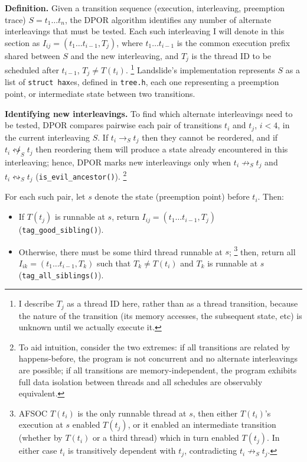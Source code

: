 {\bf Definition.}
Given a transition sequence (execution, interleaving, preemption trace) $S = t_1 \dots t_n$,
the DPOR algorithm identifies any number of alternate interleavings that must be tested.
Each such interleaving I will denote in this section as $I_{ij} = (t_1 \dots t_{i-1}, T_j)$,
where $t_1 \dots t_{i-1}$ is the common execution prefix shared between $S$ and the new interleaving,
and $T_j$ is the thread ID to be scheduled after $t_{i-1}$, $T_j \ne T(t_i)$.
\footnote{I describe $T_j$ as a thread ID here, rather than as a thread transition,
because the nature of the transition (its memory accesses, the subsequent state, etc)
is unknown until we actually execute it.}
Landslide's implementation represents $S$ as a list of {\tt struct hax}es, defined in {\tt tree.h},
each one representing a preemption point, or intermediate state between two transitions.

{\bf Identifying new interleavings.}
To find which alternate interleavings need to be tested,
DPOR compares pairwise each pair of transitions $t_i$ and $t_j$, $i<4$, in the current interleaving $S$.
If $t_i \rightarrow_S t_j$ then they cannot be reordered,
and if $t_i \not\leftrightsquigarrow_S t_j$ then reordering them
will produce a state already encountered in this interleaving;
hence, DPOR marks new interleavings only
when $t_i \not\rightarrow_S t_j$ and $t_i \leftrightsquigarrow_S t_j$
({\tt is\_evil\_ancestor()}).
\footnote{To aid intuition, consider the two extremes:
if all transitions are related by happens-before,
the program is not concurrent and no alternate interleavings are possible;
if all transitions are memory-independent,
the program exhibits full data isolation between threads and all schedules are observably equivalent.}

For each such pair, let $s$ denote the state (preemption point) before $t_i$.
Then:
\begin{itemize}
	\item If $T(t_j)$ is runnable at $s$, return $I_{ij} = (t_1 \dots t_{i-1}, T_j)$ ({\tt tag\_good\_sibling()}).
	\item Otherwise, there must be some third thread runnable at $s$;
		\footnote{AFSOC $T(t_i)$ is the only runnable thread at $s$,
		then either $T(t_i)$'s execution at $s$ enabled $T(t_j)$,
		or it enabled an intermediate transition
		(whether by $T(t_i)$ or a third thread)
		which in turn enabled $T(t_j)$.
		In either case $t_i$ is transitively dependent with $t_j$, contradicting $t_i \not\rightarrow_S t_j$.}
		then, return all $I_{ik} = (t_1 \dots t_{i-1}, T_k)$ such that
		$T_k \ne T(t_i)$ and $T_k$ is runnable at $s$
		({\tt tag\_all\_siblings()}).
\end{itemize}

